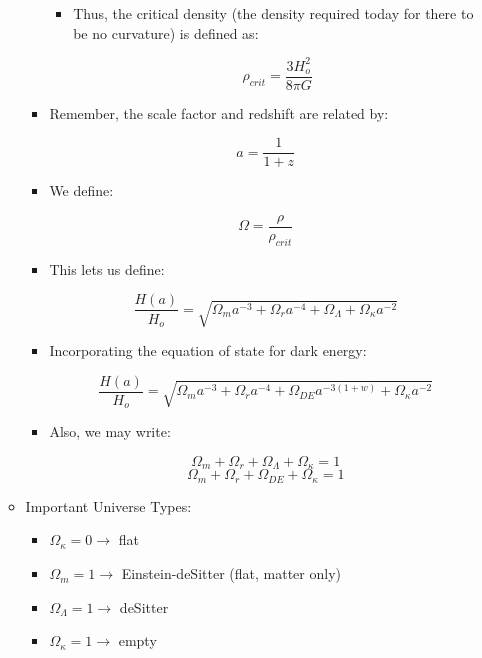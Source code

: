 \begin{itemize}
\begin{itemize}
\begin{itemize}
            \begin{itemize}

              \item Thus, the critical density (the density required today for there to be no curvature) is defined as:

                $$\rho_{crit}=\frac{3H_o^2}{8\pi G}$$

            \end{itemize}

          \item Remember, the scale factor and redshift are related by:

            $$a=\frac{1}{1+z}$$

          \item We define:

            $$\Omega=\frac{\rho}{\rho_{crit}}$$

          \item This lets us define:

            $$\frac{H(a)}{H_o}=\sqrt{\Omega_ma^{-3}+\Omega_ra^{-4}+\Omega_{\Lambda}+\Omega_{\kappa}a^{-2}}$$

          \item Incorporating the equation of state for dark energy:

            $$\frac{H(a)}{H_o}=\sqrt{\Omega_ma^{-3}+\Omega_ra^{-4}+\Omega_{DE}a^{-3(1+w)}+\Omega_{\kappa}a^{-2}}$$

          \item Also, we may write:

            $$\Omega_m+\Omega_r+\Omega_{\Lambda}+\Omega_{\kappa}=1$$
            $$\Omega_m+\Omega_r+\Omega_{DE}+\Omega_{\kappa}=1$$

        \end{itemize}

      \item Important Universe Types:

        \begin{itemize}

          \item $\Omega_{\kappa}=0\to$ flat

          \item $\Omega_{m}=1\to$ Einstein-deSitter (flat, matter only)

          \item $\Omega_{\Lambda}=1\to$ deSitter

          \item $\Omega_{\kappa}=1\to$ empty


\end{itemize}
\end{itemize}
\end{itemize}
